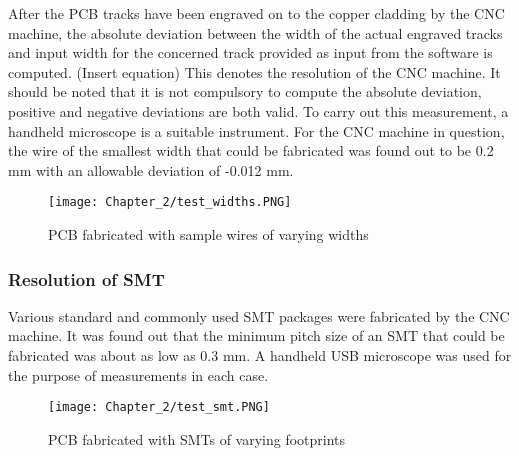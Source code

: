 After the PCB tracks have been engraved on to the copper cladding by the CNC machine, the absolute deviation between the width of the actual engraved tracks and input width for the concerned track provided as input from the software is computed. (Insert equation) This denotes the resolution of the CNC machine. It should be noted that it is not compulsory to compute the absolute deviation, positive and negative deviations are both valid. To carry out this measurement, a handheld microscope is a suitable instrument. For the CNC machine in question, the wire of the smallest width that could be fabricated was found out to be 0.2 mm with an allowable deviation of -0.012 mm.

\begin{figure}[h]
 \centering
 \texttt{[image: Chapter\_2/test\_widths.PNG]}
 \caption{PCB fabricated with sample wires of varying widths}
 \label{fig:wire_widths}
\end{figure}


\subsubsection*{Resolution of SMT}

Various standard and commonly used SMT packages were fabricated by the CNC machine. It was found out that the minimum pitch size of an SMT that could be fabricated was about as low as 0.3 mm. A handheld USB microscope was used for the purpose of measurements in each case.

\begin{figure}[h]
 \centering
 \texttt{[image: Chapter\_2/test\_smt.PNG]}
 \caption{PCB fabricated with SMTs of varying footprints}
 \label{fig:smts}
\end{figure}

